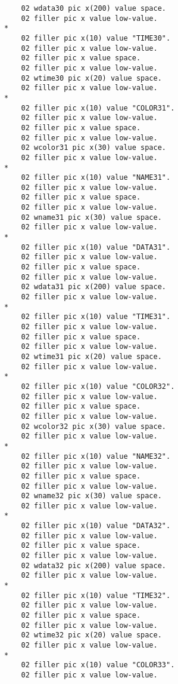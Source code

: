 {{{\begin{verbatim}
          02 wdata30 pic x(200) value space.
          02 filler pic x value low-value.
      *    
          02 filler pic x(10) value "TIME30".
          02 filler pic x value low-value.
          02 filler pic x value space.
          02 filler pic x value low-value.
          02 wtime30 pic x(20) value space.
          02 filler pic x value low-value.
      *    
          02 filler pic x(10) value "COLOR31".
          02 filler pic x value low-value.
          02 filler pic x value space.
          02 filler pic x value low-value.
          02 wcolor31 pic x(30) value space.
          02 filler pic x value low-value.
      *    
          02 filler pic x(10) value "NAME31".
          02 filler pic x value low-value.
          02 filler pic x value space.
          02 filler pic x value low-value.
          02 wname31 pic x(30) value space.
          02 filler pic x value low-value.
      *    
          02 filler pic x(10) value "DATA31".
          02 filler pic x value low-value.
          02 filler pic x value space.
          02 filler pic x value low-value.
          02 wdata31 pic x(200) value space.
          02 filler pic x value low-value.
      *    
          02 filler pic x(10) value "TIME31".
          02 filler pic x value low-value.
          02 filler pic x value space.
          02 filler pic x value low-value.
          02 wtime31 pic x(20) value space.
          02 filler pic x value low-value.
      *    
          02 filler pic x(10) value "COLOR32".
          02 filler pic x value low-value.
          02 filler pic x value space.
          02 filler pic x value low-value.
          02 wcolor32 pic x(30) value space.
          02 filler pic x value low-value.
      *    
          02 filler pic x(10) value "NAME32".
          02 filler pic x value low-value.
          02 filler pic x value space.
          02 filler pic x value low-value.
          02 wname32 pic x(30) value space.
          02 filler pic x value low-value.
      *    
          02 filler pic x(10) value "DATA32".
          02 filler pic x value low-value.
          02 filler pic x value space.
          02 filler pic x value low-value.
          02 wdata32 pic x(200) value space.
          02 filler pic x value low-value.
      *    
          02 filler pic x(10) value "TIME32".
          02 filler pic x value low-value.
          02 filler pic x value space.
          02 filler pic x value low-value.
          02 wtime32 pic x(20) value space.
          02 filler pic x value low-value.
      *    
          02 filler pic x(10) value "COLOR33".
          02 filler pic x value low-value.

\end{verbatim}}}}
